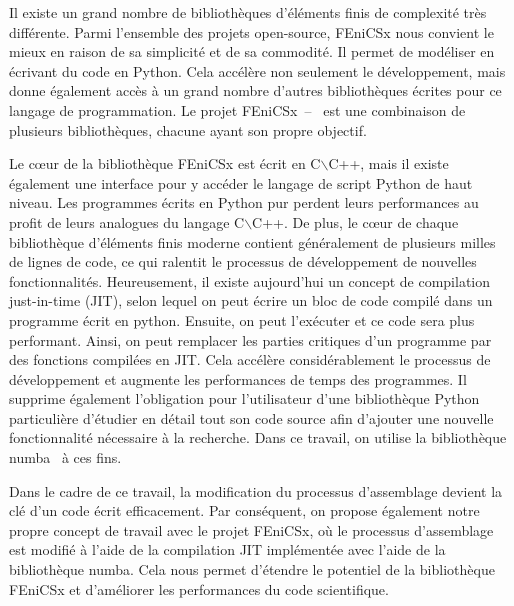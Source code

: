 \documentclass[12pt]{article}
\begin{document}
Il existe un grand nombre de bibliothèques d'éléments finis de complexité très différente. Parmi l'ensemble des projets open-source, FEniCSx nous convient le mieux en raison de sa simplicité et de sa commodité. Il permet de modéliser en écrivant du code en Python. Cela accélère non seulement le développement, mais donne également accès à un grand nombre d'autres bibliothèques écrites pour ce langage de programmation. Le projet FEniCSx~\parencite{FEniCS2015}--~\parencite{LoggEtal2012} est une combinaison de plusieurs bibliothèques, chacune ayant son propre objectif. 


Le cœur de la bibliothèque FEniCSx est écrit en C$\backslash$C++, mais il existe également une interface pour y accéder le langage de script Python de haut niveau. Les programmes écrits en Python pur perdent leurs performances au profit de leurs analogues du langage C$\backslash$C++. De plus, le cœur de chaque bibliothèque d'éléments finis moderne contient généralement de plusieurs milles de lignes de code, ce qui ralentit le processus de développement de nouvelles fonctionnalités. Heureusement, il existe aujourd'hui un concept de compilation just-in-time (JIT), selon lequel on peut écrire un bloc de code compilé dans un programme écrit en python. Ensuite, on peut l'exécuter et ce code sera plus performant. Ainsi, on peut remplacer les parties critiques d'un programme par des fonctions compilées en JIT. Cela accélère considérablement le processus de développement et augmente les performances de temps des programmes. Il supprime également l'obligation pour l'utilisateur d'une bibliothèque Python particulière d'étudier en détail tout son code source afin d'ajouter une nouvelle fonctionnalité nécessaire à la recherche. Dans ce travail, on utilise la bibliothèque numba~\parencite{Numba2015} à ces fins. 

Dans le cadre de ce travail, la modification du processus d'assemblage devient la clé d'un code écrit efficacement. Par conséquent, on propose également notre propre concept de travail avec le projet FEniCSx, où le processus d'assemblage est modifié à l'aide de la compilation JIT implémentée avec l'aide de la bibliothèque numba. Cela nous permet d'étendre le potentiel de la bibliothèque FEniCSx et d'améliorer les performances du code scientifique.
\end{document}
